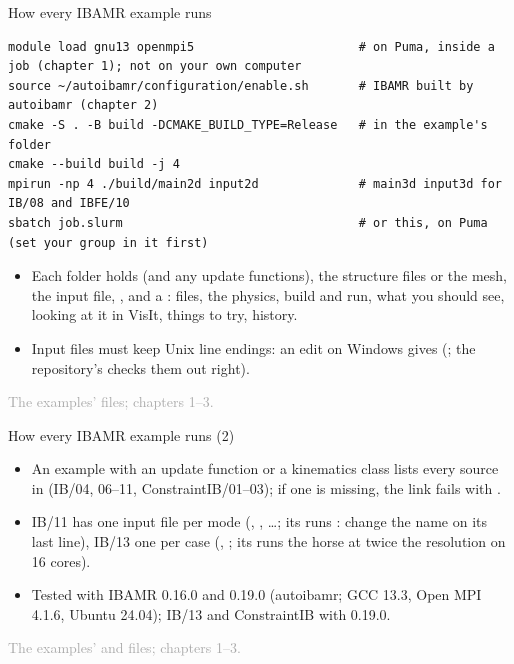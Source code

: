 \documentclass[aspectratio=169,11pt]{beamer}
\newcommand{\sourcecredit}[1]{\vfill\begin{flushright}\tiny\textcolor{DarkGray}{#1}\end{flushright}}
\begin{document}
\begin{frame}[fragile]{How every IBAMR example runs}
\label{fr:howibamr}
\begin{lstlisting}[style=shell]
module load gnu13 openmpi5                       # on Puma, inside a job (chapter 1); not on your own computer
source ~/autoibamr/configuration/enable.sh       # IBAMR built by autoibamr (chapter 2)
cmake -S . -B build -DCMAKE_BUILD_TYPE=Release   # in the example's folder
cmake --build build -j 4
mpirun -np 4 ./build/main2d input2d              # main3d input3d for IB/08 and IBFE/10
sbatch job.slurm                                 # or this, on Puma (set your group in it first)
\end{lstlisting}
\footnotesize
\begin{itemize}\setlength{\itemsep}{1pt}
  \item Each folder holds  (and any update functions), the structure files or the mesh, the input file, ,  and a : files, the physics, build and run, what you should see, looking at it in VisIt, things to try, history.
  \item Input files must keep Unix line endings: an edit on Windows gives  (; the repository's  checks them out right).
\end{itemize}
\sourcecredit{The examples'  files; chapters 1--3.}
\end{frame}

\begin{frame}{How every IBAMR example runs (2)}
\label{fr:howibamr2}
\footnotesize
\begin{itemize}\setlength{\itemsep}{1pt}
  \item An example with an update function or a kinematics class lists every source in  (IB/04, 06--11, ConstraintIB/01--03); if one is missing, the link fails with .
  \item IB/11 has one input file per mode (, , \dots; its  runs : change the name on its last line), IB/13 one per case (, ; its  runs the horse at twice the resolution on 16 cores).
  \item Tested with IBAMR 0.16.0 and 0.19.0 (autoibamr; GCC 13.3, Open MPI 4.1.6, Ubuntu 24.04); IB/13 and ConstraintIB with 0.19.0.
\end{itemize}
\sourcecredit{The examples'  and \code{job.slurm} files; chapters 1--3.}
\end{frame}
\end{document}
